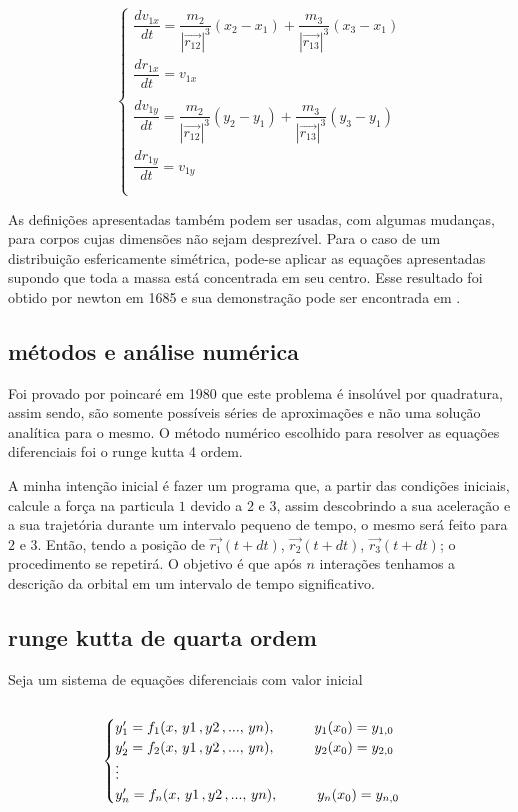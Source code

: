 \documentclass[a4paper.12pt]{article}
\begin{document}
    \begin{equation}
		\begin{cases} \label{gravity}
			\dfrac{dv_{1x}}{dt}=\dfrac{m_2}{|\vec{r_{12}}|^3}(x_2-x_1)+\dfrac{m_3}{|\vec{r_{13}}|^3}(x_3-x_1)
			\\
			\dfrac{dr_{1x}}{dt}=v_{1x}
			\\\\
			\dfrac{dv_{1y}}{dt}=\dfrac{m_2}{|\vec{r_{12}}|^3}(y_2-y_1)+\dfrac{m_3}{|\vec{r_{13}}|^3}(y_3-y_1)
			\\
			\dfrac{dr_{1y}}{dt}=v_{1y}
		\\\\\end{cases} 
	\end{equation}
	
	As definições apresentadas também podem ser usadas, com algumas mudanças, para corpos cujas dimensões não sejam desprezível. Para o caso de um distribuição esfericamente simétrica, pode-se aplicar as equações apresentadas supondo que toda a massa está concentrada em seu centro. Esse resultado foi obtido por newton em 1685 e sua demonstração pode ser encontrada em \cite{Nussenzveig}.

\subsection{métodos e análise numérica}
Foi provado por poincaré em 1980 que este problema é insolúvel por quadratura, assim sendo, são somente possíveis séries de aproximações e não uma solução analítica para o mesmo. O método numérico escolhido para resolver as equações diferenciais foi o runge kutta 4 ordem.

A minha intenção inicial é fazer um programa que, a partir das condições iniciais, calcule a força na particula $1$ devido a $2$ e $3$, assim descobrindo a sua aceleração e a sua trajetória durante um intervalo pequeno de tempo, o mesmo será feito para $2$ e $3$. Então, tendo a posição de $\vec{r_{1}}(t+dt)$, $\vec{r_{2}}(t+dt)$, $\vec{r_{3}}(t+dt)$; o procedimento se repetirá. O objetivo é que após $n$ interações tenhamos a descrição da orbital em um intervalo de tempo significativo.

\subsection{runge kutta de quarta ordem}
Seja um sistema de equações diferenciais com valor inicial \\\\
\begin{equation} \label{equação}
	\begin{cases}
		y_1'=f_1(x,\,y1\,,y2\,,...,\,yn), \;\;\;\;\;\;\;\;\;\; y_1(x_0) = y_{1,0} \\
		y_2'=f_2(x,\,y1\,,y2\,,...,\,yn), \;\;\;\;\;\;\;\;\;\; y_2(x_0) = y_{2,0}\\
		\vdots\\
		y_n'=f_n(x,\,y1\,,y2\,,...,\,yn), \;\;\;\;\;\;\;\;\;\; y_n(x_0) = y_{n,0}
	\end{cases}\\
\end{equation}
\end{document}
